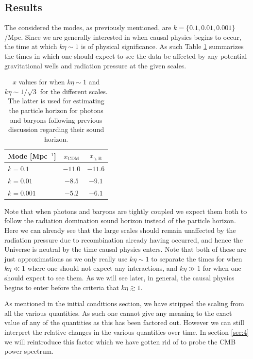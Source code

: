 \documentclass[%
reprint,
 amsmath,amssymb,
 aps,
]{revtex4-2}
\begin{document}
\subsection{Results}
The considered the modes, as previously mentioned, are $k=\{0.1,0.01,0.001\}$/Mpc. Since we are generally interested in when causal physics begins to occur, the time at which $k\eta\sim1$ is of physical significance. As such Table \ref{tab:ketasim1} summarizes the times in which one should expect to see the data be affected by any potential gravitational wells and radiation pressure at the given scales.
\renewcommand{\arraystretch}{1.25}
\begin{table}[ht!]
	\caption{$x$ values for when $k\eta\sim1$ and $k\eta\sim1/\sqrt{3}$ for the different scales. The latter is used for estimating the particle horizon for photons and baryons following previous discussion regarding their sound horizon.}
	\label{tab:ketasim1}
	\begin{tabular}{|l|c|c|}
		\hline
		Mode [Mpc$^{-1}$] & $x_\text{CDM}$ & $x_{\gamma,\text{B}}$      \\\hline
		$k=0.1$                     & $-11.0$ & $-11.6$ \\\hline
		$k=0.01$                   & $-8.5$   & $-9.1$   \\\hline
		$k=0.001$                 & $-5.2$   & $-6.1$   \\\hline
	\end{tabular}
\end{table}
Note that when photons and baryons are tightly coupled we expect them both to follow the radiation domination sound horizon instead of the particle horizon. Here we can already see that the large scales should remain unaffected by the radiation pressure due to recombination already having occurred, and hence the Universe is neutral by the time causal physics enters. Note that both of these are just approximations as we only really use $k\eta\sim1$ to separate the times for when $k\eta\ll1$ where one should not expect any interactions, and $k\eta\gg1$ for when one should expect to see them. As we will see later, in general, the causal physics begins to enter before the criteria that $k\eta\gtrsim1$. 

As mentioned in the initial conditions section, we have stripped the scaling from all the various quantities. As such one cannot give any meaning to the exact value of any of the quantities as this has been factored out. However we can still interpret the relative changes in the various quantities over time. In section \ref{sec:4} we will reintroduce this factor which we have gotten rid of to probe the CMB power spectrum.
\end{document}
